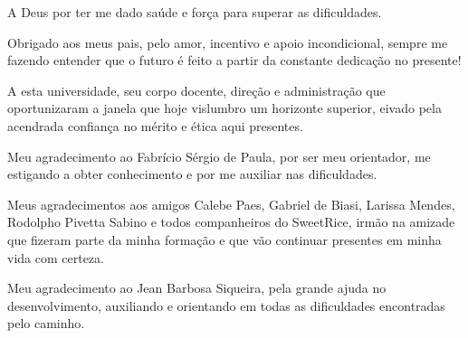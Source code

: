 \documentclass[
	12pt,				%
	openright,			%
	twoside,			%
	a4paper,			%
	chapter=TITLE,		%
	english,			%
	brazil				%
	]{abntex2}
\begin{document}









\begin{agradecimentos}

A Deus por ter me dado saúde e força para superar as dificuldades.

Obrigado aos meus pais, pelo amor, incentivo e apoio incondicional, sempre me fazendo entender que o futuro é feito a partir da constante dedicação no presente!

A esta universidade, seu corpo docente, direção e administração que oportunizaram a janela que hoje vislumbro um horizonte superior, eivado pela acendrada confiança no mérito e ética aqui presentes.

Meu agradecimento ao Fabrício Sérgio de Paula, por ser meu orientador, me estigando a obter conhecimento e por me auxiliar nas dificuldades.

Meus agradecimentos aos amigos Calebe Paes, Gabriel de Biasi, Larissa Mendes, Rodolpho Pivetta Sabino e todos companheiros do SweetRice, irmão na amizade que fizeram parte da minha formação e que vão continuar presentes em minha vida com certeza.

Meu agradecimento ao Jean Barbosa Siqueira, pela grande ajuda no desenvolvimento, auxiliando e orientando em todas as dificuldades encontradas pelo caminho. 

 


\end{agradecimentos}
\end{document}
